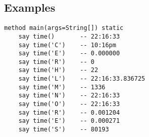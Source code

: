 \subsection{Examples}

\begin{lstlisting}[label=timeexample,caption=Example of using Time()]
  method main(args=String[]) static
    say time()       -- 22:16:33
    say time('C')    -- 10:16pm
    say time('E')    -- 0.000000
    say time('R')    -- 0
    say time('H')    -- 22
    say time('L')    -- 22:16:33.836725
    say time('M')    -- 1336
    say time('N')    -- 22:16:33
    say time('O')    -- 22:16:33
    say time('R')    -- 0.001204
    say time('E')    -- 0.000271
    say time('S')    -- 80193
  \end{lstlisting}

